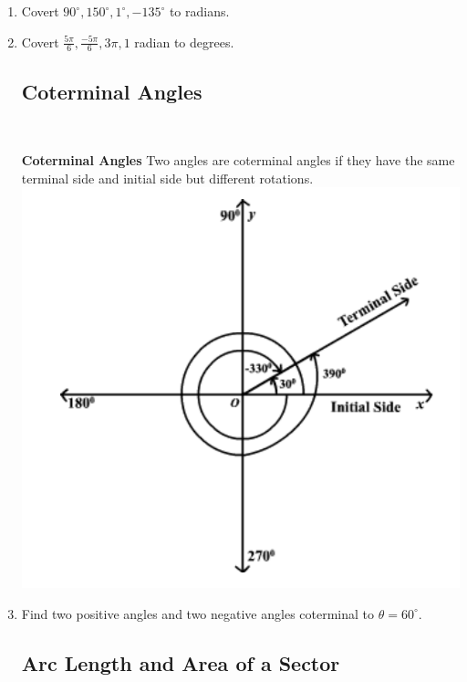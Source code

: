 \begin{enumerate}
\item Covert $90^\circ, 150^\circ, 1^\circ, -135^\circ$ to radians.\\[1in]
\newpage

\item Covert $\frac{5\pi}{6}, \frac{-5\pi}{6}, 3\pi, 1$ radian to degrees.\\[1in]



\subsection{Coterminal Angles} ~

\textbf{Coterminal Angles}  Two angles are coterminal angles if they have the same terminal side and initial side but different rotations.\\

\includegraphics[scale=.7]{coterminal}\\

\item Find two positive angles and two negative angles coterminal to $\theta = 60^\circ$.  \\[1in]

\subsection{Arc Length and Area of a Sector} ~



\end{enumerate}
